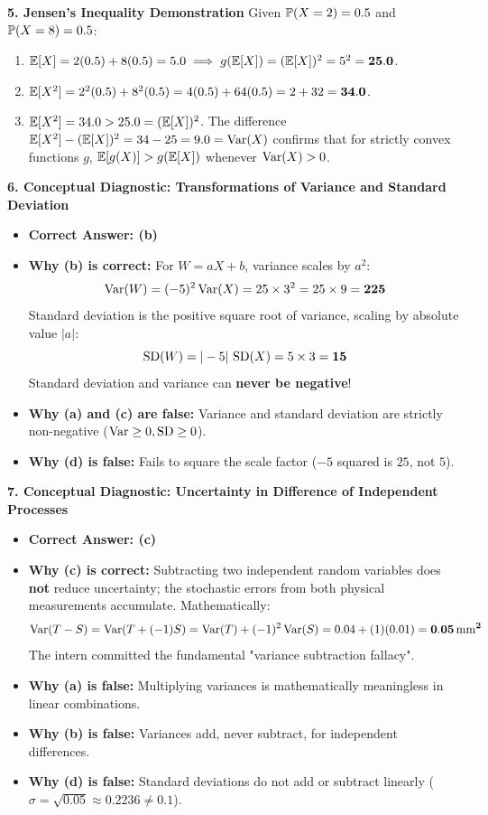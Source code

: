 \textbf{5. Jensen's Inequality Demonstration}
Given $\P(X = 2) = 0.5$ and $\P(X = 8) = 0.5$:
\begin{enumerate}
    \item $\E[X] = 2(0.5) + 8(0.5) = 5.0 \implies g(\E[X]) = (\E[X])^2 = 5^2 = \mathbf{25.0}$.
    \item $\E[X^2] = 2^2(0.5) + 8^2(0.5) = 4(0.5) + 64(0.5) = 2 + 32 = \mathbf{34.0}$.
    \item $\E[X^2] = 34.0 > 25.0 = (\E[X])^2$.
    The difference $\E[X^2] - (\E[X])^2 = 34 - 25 = 9.0 = \Var(X)$ confirms that for strictly convex functions $g$, $\E[g(X)] > g(\E[X])$ whenever $\Var(X) > 0$.
\end{enumerate}

\textbf{6. Conceptual Diagnostic: Transformations of Variance and Standard Deviation}
\begin{itemize}
    \item \textbf{Correct Answer: (b)}
    \item \textbf{Why (b) is correct:} For $W = aX + b$, variance scales by $a^2$:
    $$\Var(W) = (-5)^2 \Var(X) = 25 \times 3^2 = 25 \times 9 = \mathbf{225}$$
    Standard deviation is the positive square root of variance, scaling by absolute value $|a|$:
    $$\SD(W) = |-5|\,\SD(X) = 5 \times 3 = \mathbf{15}$$
    Standard deviation and variance can \textbf{never be negative}!
    \item \textbf{Why (a) and (c) are false:} Variance and standard deviation are strictly non-negative ($\Var \ge 0, \SD \ge 0$).
    \item \textbf{Why (d) is false:} Fails to square the scale factor ($-5$ squared is $25$, not $5$).
\end{itemize}

\textbf{7. Conceptual Diagnostic: Uncertainty in Difference of Independent Processes}
\begin{itemize}
    \item \textbf{Correct Answer: (c)}
    \item \textbf{Why (c) is correct:} Subtracting two independent random variables does \textbf{not} reduce uncertainty; the stochastic errors from both physical measurements accumulate. Mathematically:
    $$\Var(T - S) = \Var(T + (-1)S) = \Var(T) + (-1)^2\Var(S) = 0.04 + (1)(0.01) = \mathbf{0.05\,\text{mm}^2}$$
    The intern committed the fundamental "variance subtraction fallacy".
    \item \textbf{Why (a) is false:} Multiplying variances is mathematically meaningless in linear combinations.
    \item \textbf{Why (b) is false:} Variances add, never subtract, for independent differences.
    \item \textbf{Why (d) is false:} Standard deviations do not add or subtract linearly ($\sigma = \sqrt{0.05} \approx 0.2236 \neq 0.1$).
\end{itemize}


